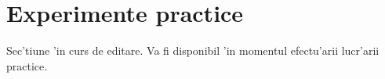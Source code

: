\section{Experimente practice}

Sec'tiune 'in curs de editare. Va fi disponibil 'in momentul efectu'arii lucr'arii practice.
